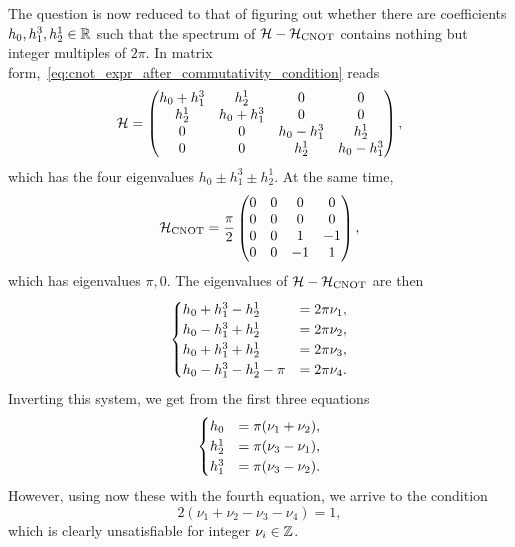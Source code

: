 \begin{example}[label={ex:cnot_with_conditions}]
The question is now reduced to that of figuring out whether there are coefficients $h_0,h_1^3,h_2^1\in\mathbb{R}$ such that the spectrum of $\mathcal{H}-\mathcal{H}_{\operatorname{CNOT}}$ contains nothing but integer multiples of $2\pi$.
In matrix form,~\cref{eq:cnot_expr_after_commutativity_condition} reads
\begin{equation}
    \mathcal{H} = \begin{pmatrix}
        h_0 + h_1^3 & h_2^1 & 0 & 0 \\
        h_2^1 & h_0 + h_1^3 & 0 & 0 \\
        0 & 0 & h_0 - h_1^3 & h_2^1 \\
        0 & 0 & h_2^1 & h_0 - h_1^3
    \end{pmatrix},
\end{equation}
which has the four eigenvalues $h_0\pm h_1^3 \pm h_2^1$.
At the same time,
\begin{equation}
    \mathcal{H}_{\operatorname{CNOT}} = \frac{\pi}{2}\begin{pmatrix}
        0 & 0 & 0 & 0 \\
        0 & 0 & 0 & 0 \\
        0 & 0 & 1 & -1 \\
        0 & 0 & -1 & 1
    \end{pmatrix},
\end{equation}
which has eigenvalues $\pi,0$. The eigenvalues of $\mathcal{H}-\mathcal{H}_{\operatorname{CNOT}}$ are then
\begin{equation}
\def\id{h_0}
\def\Z1{h_1^3}
\def\X2{h_2^1}
\begin{cases}
    \id + \Z1 - \X2 &= 2\pi \nu_1, \\
    \id - \Z1 + \X2 &= 2\pi \nu_2, \\
    \id + \Z1 + \X2 &= 2\pi \nu_3, \\
    \id - \Z1 - \X2 - \pi &= 2\pi \nu_4.
\end{cases}
\end{equation}
Inverting this system, we get from the first three equations
\begin{equation}
\def\id{h_0}
\def\Z1{h_1^3}
\def\X2{h_2^1}
\begin{cases}
    \id &= \pi (\nu_1 + \nu_2), \\
    \X2 &= \pi (\nu_3 - \nu_1), \\
    \Z1 &= \pi (\nu_3 - \nu_2).
\end{cases}
\end{equation}
However, using now these with the fourth equation, we arrive to the condition
\begin{equation}
    2(\nu_1 + \nu_2 - \nu_3 - \nu_4) = 1,
\end{equation}
which is clearly unsatisfiable for integer $\nu_i\in\mathbb{Z}$.


\end{example}
